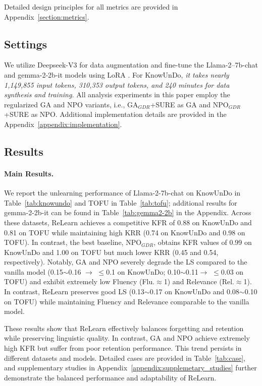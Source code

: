Detailed design principles for all metrics are provided in Appendix~\ref{section:metrics}.

\subsection{Settings}
We utilize Deepseek-V3 \citep{deepseekai2024deepseekv3technicalreport} for data augmentation and fine-tune the Llama-2–7b-chat \citep{touvron2023llama2openfoundation} and gemma-2-2b-it \citep{gemmateam2024gemma2improvingopen} models using LoRA \citep{hu2021loralowrankadaptationlarge}. 
For KnowUnDo, \emph{it takes nearly 1,149,855 input tokens, 310,353 output tokens, and 240 minutes for data synthesis and training.} 
All analysis experiments in this paper employ the regularized GA and NPO variants, i.e., GA$_{GDR}$+SURE as GA and NPO$_{GDR}$+SURE as NPO.
Additional implementation details are provided in the Appendix~\ref{appendix:implementation}.



\subsection{Results}
\paragraph{Main Results.}
We report the unlearning performance of Llama-2-7b-chat on KnowUnDo in Table~\ref{tab:knowundo} and TOFU in Table~\ref{tab:tofu}; additional results for gemma-2-2b-it can be found in Table~\ref{tab:gemma2-2b} in the Appendix. 
Across these datasets, ReLearn achieves a competitive KFR of 0.88 on KnowUnDo and 0.81 on TOFU while maintaining high KRR (0.74 on KnowUnDo and 0.98 on TOFU). 
In contrast, the best baseline, NPO$_{GDR}$, obtains KFR values of 0.99 on KnowUnDo and 1.00 on TOFU but much lower KRR (0.45 and 0.54, respectively). 
Notably, GA and NPO severely degrade the LS compared to the vanilla model (0.15$\sim$0.16 $\to$ $\leq$0.1 on KnowUnDo; 0.10$\sim$0.11$ \to$ $\leq$0.03 on TOFU) and exhibit extremely low Fluency (Flu.$\approx$1) and Relevance (Rel.$\approx$1).
In contrast, ReLearn preserves good LS (0.13$\sim$0.17 on KnowUnDo and 0.08$\sim$0.10 on TOFU) while maintaining Fluency and Relevance comparable to the vanilla model.

These results show that ReLearn effectively balances forgetting and retention while preserving linguistic quality. 
In contrast, GA and NPO achieve extremely high KFR but suffer from poor retention performance.
This trend persists in different datasets and models.
Detailed cases are provided in Table~\ref{tab:case},  
and supplementary studies in Appendix~\ref{appendix:supplemetary_studies} further demonstrate the balanced performance and adaptability of ReLearn.

